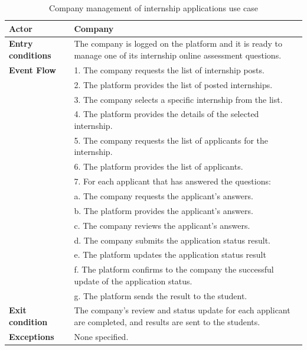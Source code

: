 \begin{table}[h!]
    \centering
    \begin{tabular}{lp{10cm}}
        \textbf{Actor} & Company \\ \hline
        \textbf{Entry conditions} & The company is logged on the platform and it is ready to manage one of its internship online assessment questions. \\ \hline
        \textbf{Event Flow} &
        1. The company requests the list of internship posts. \\
        & 2. The platform provides the list of posted internships. \\
        & 3. The company selects a specific internship from the list. \\
        & 4. The platform provides the details of the selected internship. \\
        & 5. The company requests the list of applicants for the internship. \\
        & 6. The platform provides the list of applicants. \\
        & 7. For each applicant that has answered the questions: \\
        & \quad a. The company requests the applicant's answers. \\
        & \quad b. The platform provides the applicant's answers. \\
        & \quad c. The company reviews the applicant's answers. \\
        & \quad d. The company submits the application status result. \\
        & \quad e. The platform updates the application status result \\
        & \quad f. The platform confirms to the company the successful update of the application status. \\
        & \quad g. The platform sends the result to the student. \\
        \hline
        \textbf{Exit condition} & The company's review and status update for each applicant are completed, and results are sent to the students. \\ \hline
        \textbf{Exceptions} & None specified. \\
    \end{tabular}
    \caption{Company management of internship applications use case}
    \label{tab:company_manage_internship_applications}
\end{table}

